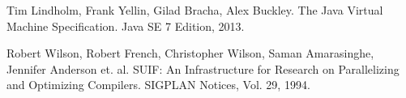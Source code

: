 \begin{thebibliography}{99}
Tim Lindholm, Frank Yellin, Gilad Bracha, Alex Buckley.
The Java Virtual Machine Specification.
Java SE 7 Edition, 2013.

Robert Wilson, Robert French, Christopher Wilson, Saman Amarasinghe, Jennifer Anderson et. al. 
SUIF: An Infrastructure for Research on Parallelizing and Optimizing Compilers. SIGPLAN Notices, Vol. 29, 1994.
\end{thebibliography}
